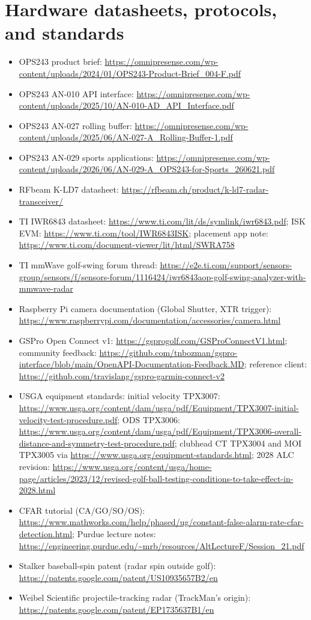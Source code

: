 \section{Hardware datasheets, protocols, and standards}
\begin{itemize}\small
\item OPS243 product brief:
  \url{https://omnipresense.com/wp-content/uploads/2024/01/OPS243-Product-Brief_004-F.pdf}
\item OPS243 AN-010 API interface:
  \url{https://omnipresense.com/wp-content/uploads/2025/10/AN-010-AD_API_Interface.pdf}
\item OPS243 AN-027 rolling buffer:
  \url{https://omnipresense.com/wp-content/uploads/2025/06/AN-027-A_Rolling-Buffer-1.pdf}
\item OPS243 AN-029 sports applications:
  \url{https://omnipresense.com/wp-content/uploads/2026/06/AN-029-A_OPS243-for-Sports_260621.pdf}
\item RFbeam K-LD7 datasheet:
  \url{https://rfbeam.ch/product/k-ld7-radar-transceiver/}
\item TI IWR6843 datasheet:
  \url{https://www.ti.com/lit/ds/symlink/iwr6843.pdf}; ISK EVM:
  \url{https://www.ti.com/tool/IWR6843ISK}; placement app note:
  \url{https://www.ti.com/document-viewer/lit/html/SWRA758}
\item TI mmWave golf-swing forum thread:
  \url{https://e2e.ti.com/support/sensors-group/sensors/f/sensors-forum/1116424/iwr6843aop-golf-swing-analyzer-with-mmwave-radar}
\item Raspberry Pi camera documentation (Global Shutter, XTR trigger):
  \url{https://www.raspberrypi.com/documentation/accessories/camera.html}
\item GSPro Open Connect v1: \url{https://gsprogolf.com/GSProConnectV1.html};
  community feedback:
  \url{https://github.com/tnbozman/gspro-interface/blob/main/OpenAPI-Documentation-Feedback.MD};
  reference client:
  \url{https://github.com/travislang/gspro-garmin-connect-v2}
\item USGA equipment standards: initial velocity TPX3007:
  \url{https://www.usga.org/content/dam/usga/pdf/Equipment/TPX3007-initial-velocity-test-procedure.pdf};
  ODS TPX3006:
  \url{https://www.usga.org/content/dam/usga/pdf/Equipment/TPX3006-overall-distance-and-symmetry-test-procedure.pdf};
  clubhead CT TPX3004 and MOI TPX3005 via
  \url{https://www.usga.org/equipment-standards.html};
  2028 ALC revision:
  \url{https://www.usga.org/content/usga/home-page/articles/2023/12/revised-golf-ball-testing-conditions-to-take-effect-in-2028.html}
\item CFAR tutorial (CA/GO/SO/OS):
  \url{https://www.mathworks.com/help/phased/ug/constant-false-alarm-rate-cfar-detection.html};
  Purdue lecture notes:
  \url{https://engineering.purdue.edu/~mrb/resources/AltLectureF/Session_21.pdf}
\item Stalker baseball-spin patent (radar spin outside golf):
  \url{https://patents.google.com/patent/US10935657B2/en}
\item Weibel Scientific projectile-tracking radar (TrackMan's origin):
  \url{https://patents.google.com/patent/EP1735637B1/en}
\end{itemize}

